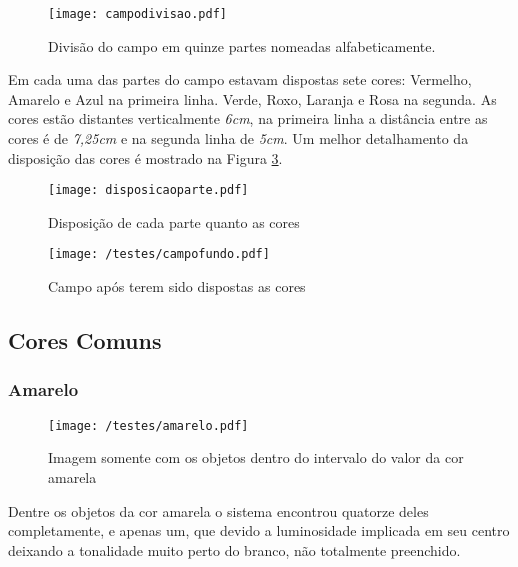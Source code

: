 \begin{figure}[H]
		\centering
		\texttt{[image: campodivisao.pdf]}
		\caption{Divisão do campo em quinze partes nomeadas alfabeticamente.}
		\label{campodivisao}
	\end{figure}
	
Em cada uma das partes do campo estavam dispostas sete cores: Vermelho, Amarelo e Azul na primeira linha. Verde, Roxo, Laranja e Rosa na segunda. As cores estão distantes verticalmente \textit{6cm}, na primeira linha a distância entre as cores é de \textit{7,25cm} e na segunda linha de \textit{5cm}. Um  melhor detalhamento da disposição das cores é mostrado na Figura \ref{disposicaoparte}.


\begin{figure}[H]
\begin{minipage}[b]{0.45\linewidth}
\centering
\texttt{[image: disposicaoparte.pdf]}
\caption{Disposição de cada parte quanto as cores}
\label{fig:figure1}
\end{minipage}
\hspace{0.5cm}
\begin{minipage}[b]{0.45\linewidth}
\centering
\texttt{[image: /testes/campofundo.pdf]}
\caption{Campo após terem sido dispostas as cores}
\label{fig:figure2}
\end{minipage}
\end{figure}

\subsection{Cores Comuns}
\subsubsection{Amarelo}
	\begin{figure}[H]
		\centering
		\texttt{[image: /testes/amarelo.pdf]}
		\caption{Imagem somente com os objetos dentro do intervalo do valor da cor amarela}
		\label{disposicaoparte}
	\end{figure}
	
	Dentre os objetos da cor amarela o sistema encontrou quatorze deles completamente, e apenas um, que devido a luminosidade implicada em seu centro deixando a tonalidade muito perto do branco, não totalmente preenchido.
	
